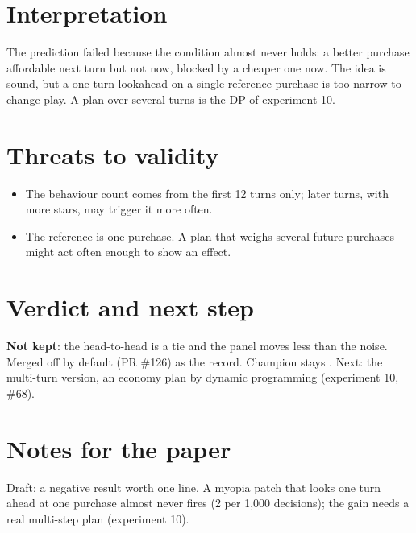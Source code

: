 \documentclass{../polyexp}
\begin{document}
\section{Interpretation}
The prediction failed because the condition almost never holds: a better purchase affordable next turn but not now, blocked by a cheaper one now. The idea is sound, but a one-turn lookahead on a single reference purchase is too narrow to change play. A plan over several turns is the DP of experiment 10.


\section{Threats to validity}
\begin{itemize}
\item The behaviour count comes from the first 12 turns only; later turns, with more stars, may trigger it more often.
\item The reference is one purchase. A plan that weighs several future purchases might act often enough to show an effect.
\end{itemize}

\section{Verdict and next step}
\textbf{Not kept}: the head-to-head is a tie and the panel moves less than the noise. Merged off by default (PR \#126) as the record. Champion stays . Next: the multi-turn version, an economy plan by dynamic programming (experiment 10, \#68).

\section{Notes for the paper}
Draft: a negative result worth one line. A myopia patch that looks one turn ahead at one purchase almost never fires (2 per 1,000 decisions); the gain needs a real multi-step plan (experiment 10).

\end{document}

